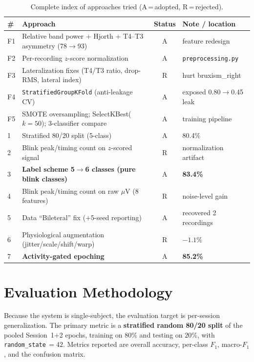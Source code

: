 \documentclass[11pt,a4paper]{article}
\newcommand{\muv}{$\mu$V}
\newcommand{\fone}{$F_1$}
\newcommand{\code}[1]{\texttt{#1}}
\begin{document}
\begin{table}[h]
\centering
\caption{Complete index of approaches tried (A\,=\,adopted, R\,=\,rejected).}
\label{tab:index}
\small
\begin{tabular}{@{}llcl@{}}
\toprule
\# & Approach & Status & Note / location \\
\midrule
F1 & Relative band power $+$ Hjorth $+$ T4--T3 asymmetry (78$\to$93) & A & feature redesign \\
F2 & Per-recording $z$-score normalization & A & \code{preprocessing.py} \\
F3 & Lateralization fixes (T4/T3 ratio, drop-RMS, lateral index) & R & hurt bruxism\_right \\
F4 & \code{StratifiedGroupKFold} (anti-leakage CV) & A & exposed 0.80$\to$0.45 leak \\
F5 & SMOTE oversampling; SelectKBest($k{=}50$); 3-classifier compare & A & training pipeline \\
1  & Stratified 80/20 split (5-class) & A & 80.4\% \\
2  & Blink peak/timing count on $z$-scored signal & R & normalization artifact \\
3  & \textbf{Label scheme 5$\to$6 classes (pure blink classes)} & A & \textbf{83.4\%} \\
4  & Blink peak/timing count on raw \muv{} (8 features) & R & noise-level gain \\
5  & Data ``Bileteral'' fix ($+$5-seed reporting) & A & recovered 2 recordings \\
6  & Physiological augmentation (jitter/scale/shift/warp) & R & $-1.1\%$ \\
7  & \textbf{Activity-gated epoching} & A & \textbf{85.2\%} \\
\bottomrule
\end{tabular}
\end{table}

\section{Evaluation Methodology}
\label{sec:method}
Because the system is single-subject, the evaluation target is per-session
generalization. The primary metric is a \textbf{stratified random 80/20 split}
of the pooled Session~1$+$2 epochs, training on $80\%$ and testing on $20\%$,
with \code{random\_state}\,$=42$. Metrics reported are overall accuracy,
per-class \fone{}, macro-\fone{}, and the confusion matrix.
\end{document}
